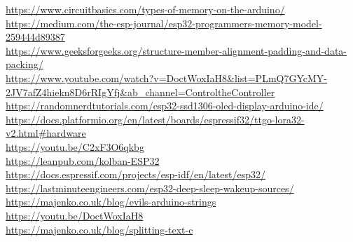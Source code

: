\documentclass[11pt,a4paper]{article}
\begin{document}
\url{https://www.circuitbasics.com/types-of-memory-on-the-arduino/}\\[4pt]
\url{https://medium.com/the-esp-journal/esp32-programmers-memory-model-259444d89387}\\[4pt]
\url{https://www.geeksforgeeks.org/structure-member-alignment-padding-and-data-packing/}\\[4pt]
\url{https://www.youtube.com/watch?v=DoctWoxIaH8&list=PLmQ7GYcMY-2JV7afZ4hiekn8D6rRIgYfj&ab_channel=ControltheController}\\[4pt]
\url{https://randomnerdtutorials.com/esp32-ssd1306-oled-display-arduino-ide/}\\[4pt]
\url{https://docs.platformio.org/en/latest/boards/espressif32/ttgo-lora32-v2.html#hardware}\\[4pt]
\url{https://youtu.be/C2xF3O6qkbg}\\[4pt]
\url{https://leanpub.com/kolban-ESP32}\\[4pt]
\url{https://docs.espressif.com/projects/esp-idf/en/latest/esp32/}\\[4pt]
\url{https://lastminuteengineers.com/esp32-deep-sleep-wakeup-sources/}\\[4pt]
\url{https://majenko.co.uk/blog/evils-arduino-strings}\\[4pt]
\url{https://youtu.be/DoctWoxIaH8}\\[4pt]
\url{https://majenko.co.uk/blog/splitting-text-c}


\nocite{*}   %
\printbibliography[heading=bibintoc]
\end{document}
